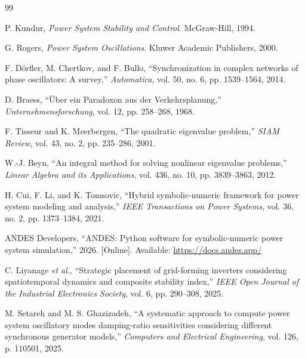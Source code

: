 \documentclass[conference]{IEEEtran}
\begin{document}
\begin{thebibliography}{99}

P. Kundur, \emph{Power System Stability and Control}. McGraw-Hill, 1994.

G. Rogers, \emph{Power System Oscillations}. Kluwer Academic Publishers, 2000.

F. D\"orfler, M. Chertkov, and F. Bullo, ``Synchronization in complex networks of phase oscillators: A survey,'' \emph{Automatica}, vol. 50, no. 6, pp. 1539--1564, 2014.

D. Braess, ``\"Uber ein Paradoxon aus der Verkehrsplanung,'' \emph{Unternehmensforschung}, vol. 12, pp. 258--268, 1968.

F. Tisseur and K. Meerbergen, ``The quadratic eigenvalue problem,'' \emph{SIAM Review}, vol. 43, no. 2, pp. 235--286, 2001.

W.-J. Beyn, ``An integral method for solving nonlinear eigenvalue problems,'' \emph{Linear Algebra and its Applications}, vol. 436, no. 10, pp. 3839--3863, 2012.

H. Cui, F. Li, and K. Tomsovic, ``Hybrid symbolic-numeric framework for power system modeling and analysis,'' \emph{IEEE Transactions on Power Systems}, vol. 36, no. 2, pp. 1373--1384, 2021.

ANDES Developers, ``ANDES: Python software for symbolic-numeric power system simulation,'' 2026. [Online]. Available: \url{https://docs.andes.app/}

C. Liyanage \emph{et al.}, ``Strategic placement of grid-forming inverters considering spatiotemporal dynamics and composite stability index,'' \emph{IEEE Open Journal of the Industrial Electronics Society}, vol. 6, pp. 290--308, 2025.

M. Setareh and M. S. Ghazizadeh, ``A systematic approach to compute power system oscillatory modes damping-ratio sensitivities considering different synchronous generator models,'' \emph{Computers and Electrical Engineering}, vol. 126, p. 110501, 2025.

\end{thebibliography}
\end{document}
